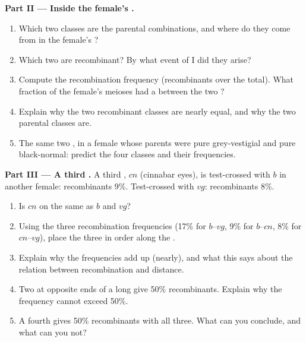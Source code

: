 \begin{problem}
\medskip
\noindent\textbf{Part II --- Inside the female's .}
\begin{enumerate}[resume]
  \item Which two classes are the parental combinations, and where do
        they come from in the female's ?
  \item Which two are recombinant? By what event of  I did they
        arise?
  \item Compute the recombination frequency (recombinants over the
        total). What fraction of the female's meioses had a
         between the two ?
  \item Explain why the two recombinant classes are nearly equal, and
        why the two parental classes are.
  \item The same two , in a female whose parents were pure
        grey-vestigial and pure black-normal: predict the four classes
        and their frequencies.
\end{enumerate}

\medskip
\noindent\textbf{Part III --- A third .}
A third , $cn$ (cinnabar eyes), is test-crossed with $b$ in another
female: recombinants 9\%. Test-crossed with $vg$: recombinants 8\%.
\begin{enumerate}[resume]
  \item Is $cn$ on the same  as $b$ and $vg$?
  \item Using the three recombination frequencies (17\% for $b$--$vg$,
        9\% for $b$--$cn$, 8\% for $cn$--$vg$), place the three 
        in order along the .
  \item Explain why the frequencies add up (nearly), and what this
        says about the relation between recombination and distance.
  \item Two  at opposite ends of a long  give 50\%
        recombinants. Explain why the frequency cannot exceed 50\%.
  \item A fourth  gives 50\% recombinants with all three. What can
        you conclude, and what can you not?
\end{enumerate}


\end{problem}
